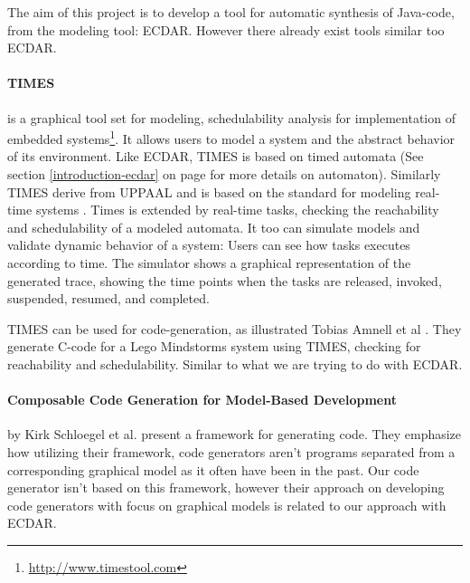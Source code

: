 The aim of this project is to develop a tool for automatic synthesis of Java-code, from the modeling tool: ECDAR. However there already exist tools similar too ECDAR.

\paragraph{TIMES} is a graphical tool set for modeling, schedulability analysis for implementation of embedded systems\footnote{\url{http://www.timestool.com}}. It allows users to model a system and the abstract behavior of its environment. 
Like ECDAR, TIMES is based on timed automata (See section \ref{introduction-ecdar} on page \pageref{introduction-ecdar} for more details on automaton). Similarly TIMES derive from UPPAAL and is based on the standard for modeling real-time systems \cite{Alur1994:183}.
Times is extended by real-time tasks, checking the reachability and schedulability of a modeled automata. It too can simulate models and validate dynamic behavior of a system: Users can see how tasks executes according to time. The simulator shows a graphical representation of the generated trace, showing the time points when the tasks are released, invoked, suspended, resumed, and completed.

TIMES can be used for code-generation, as illustrated Tobias Amnell et al \cite{Amnell:2002:CST:779110.779112}. They generate C-code for a Lego Mindstorms system using TIMES, checking for reachability and schedulability. Similar to what we are trying to do with ECDAR. 





\paragraph{Composable Code Generation for Model-Based Development}
by Kirk Schloegel et al. present a framework for generating
code\cite{composable-code-generation}. They emphasize how utilizing their
framework, code generators aren't programs separated from a corresponding
graphical model as it often have been in the past. Our code generator isn't
based on this framework, however their approach on developing code generators
with focus on graphical models is related to our approach with ECDAR.

